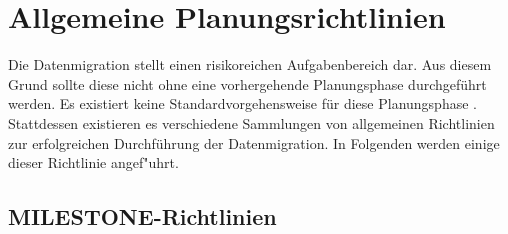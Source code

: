 \section{Allgemeine Planungsrichtlinien}
\label{chapter:richtlinien}

Die Datenmigration stellt einen risikoreichen Aufgabenbereich dar. Aus diesem Grund sollte diese nicht ohne eine vorhergehende Planungsphase durchgeführt werden. Es existiert keine Standardvorgehensweise für diese Planungsphase \cite[S.~3]{wuLawless-1997}. Stattdessen existieren es verschiedene Sammlungen von allgemeinen Richtlinien zur erfolgreichen Durchführung der Datenmigration. In Folgenden werden einige dieser Richtlinie angef"uhrt.

\subsection{MILESTONE-Richtlinien}


